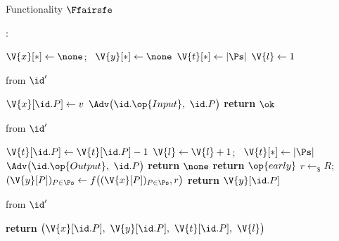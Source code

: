 \begin{interface}[nofloat]{Functionality $\Ffairsfe$ \\
}

{\scriptsize
\setlength{\columnsep}{1.4em}
\begin{multicols}{2}
:
\begin{algorithmic}[1]
\setcounter{contline}{0}\algcont
\State $\V{x}[*] \gets \none$; \ $\V{y}[*] \gets \none$
\State $\V{t}[*] \gets |\Ps|$
\State $\V{l} \gets 1$
\algsave
\end{algorithmic}
\vspace{1.4ex}

 \quad from $\id'$
\begin{algorithmic}[1]
\algcont
\State $\V{x}[\id.P] \gets v$ \label{ln:fairsfeoverwrite}
\State $\Adv\bigl(\id.\op{Input},\ \id.P\bigr)$
\State \textbf{return} $\ok$
\algsave
\end{algorithmic}
\vspace{1.4ex}

\columnbreak

 \quad from $\id'$
\begin{algorithmic}[1]
\algcont
{} \label{ln:fairsfeown}
  \State $\V{t}[\id.P] \gets \V{t}[\id.P] - 1$ \label{ln:fairsfespend}
    \State $\V{l} \gets \V{l} + 1$; \ $\V{t}[*] \gets |\Ps|$ \label{ln:fairsferound}
  \EndIf
  \State $\Adv\bigl(\id.\op{Output},\ \id.P\bigr)$ \label{ln:fairsfeactivate}
  \State \textbf{return} $\none$
\EndIf
{}
  \State \textbf{return} $\op{early}$ \label{ln:fairsfeearly}
\EndIf
{}
  \State $r \gets_{\$} R$; \ $(\V{y}[P])_{P \in \Ps} \gets f\bigl((\V{x}[P])_{P \in \Ps}, r\bigr)$ \label{ln:fairsfeeval}
\EndIf
\State \textbf{return} $\V{y}[\id.P]$ \label{ln:fairsfegod}
\algsave
\end{algorithmic}
\vspace{1.4ex}

 \quad from $\id'$
\begin{algorithmic}[1]
\algcont
\State \textbf{return} $\bigl(\V{x}[\id.P],\ \V{y}[\id.P],\ \V{t}[\id.P],\ \V{l}\bigr)$ \label{ln:fairsfeleak}
\algsave
\end{algorithmic}
\end{multicols}}
\end{interface}
